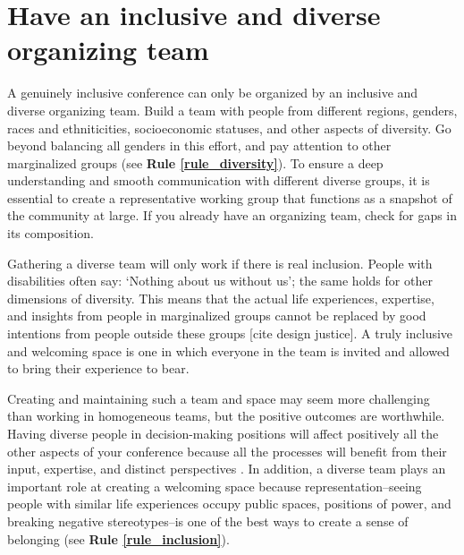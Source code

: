 \documentclass[10pt,letterpaper]{article}
\begin{document}

\section{Have an inclusive and diverse organizing team}
\label{rule_organizing_team}

A genuinely inclusive conference can only be organized by an inclusive and diverse organizing team. Build a team with people from different regions, genders, races and ethniticities, socioeconomic statuses, and other aspects of diversity. 
Go beyond balancing all genders in this effort, and pay attention to other marginalized groups (see \textbf{Rule \ref{rule_diversity}}). To ensure a deep understanding and smooth communication with different diverse groups, it is essential to create a representative working group that functions as a snapshot of the community at large. If you already have an organizing team, check for gaps in its composition. 



Gathering a diverse team will only work if there is real inclusion. People with disabilities often say: `Nothing about us without us'; the same holds for other dimensions of diversity. This means that the actual life experiences, expertise, and insights from people in marginalized groups cannot be replaced by good intentions from people outside these groups [cite design justice]. A truly inclusive and welcoming space is one in which everyone in the team is invited and allowed to bring their experience to bear. 


Creating and maintaining such a team and space may seem more challenging than working in homogeneous teams, but the positive outcomes are worthwhile. 
Having diverse people in decision-making positions will affect positively all the other aspects of your conference because all the processes will benefit from their input, expertise, and distinct perspectives \cite{hongGroupsDiverseProblem2004}. In addition, a diverse team plays an important role at creating a welcoming space because representation--seeing people with similar life experiences occupy public spaces, positions of power, and breaking negative stereotypes--is one of the best ways to create a sense of belonging (see \textbf{Rule \ref{rule_inclusion}}). 
\end{document}
